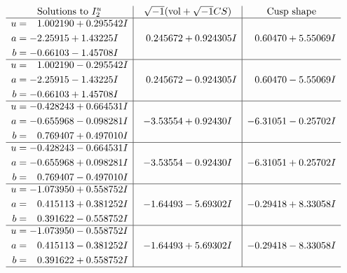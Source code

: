 \documentclass[1p]{elsarticle_modified}
\theoremstyle{definition}
\newcommand{\I}{\sqrt{-1}}
\begin{document}
$$\begin{array}{c|c|c}  
\text{Solutions to }I^u_{2}& \I (\text{vol} + \sqrt{-1}CS) & \text{Cusp shape}\\
 \hline 
\begin{aligned}
u &= \phantom{-}1.002190 + 0.295542 I \\
a &= -2.25915 + 1.43225 I \\
b &= -0.66103 - 1.45708 I\end{aligned}
 & \phantom{-}0.245672 + 0.924305 I & \phantom{-}0.60470 + 5.55069 I \\ \hline\begin{aligned}
u &= \phantom{-}1.002190 - 0.295542 I \\
a &= -2.25915 - 1.43225 I \\
b &= -0.66103 + 1.45708 I\end{aligned}
 & \phantom{-}0.245672 - 0.924305 I & \phantom{-}0.60470 - 5.55069 I \\ \hline\begin{aligned}
u &= -0.428243 + 0.664531 I \\
a &= -0.655968 - 0.098281 I \\
b &= \phantom{-}0.769407 + 0.497010 I\end{aligned}
 & -3.53554 + 0.92430 I & -6.31051 - 0.25702 I \\ \hline\begin{aligned}
u &= -0.428243 - 0.664531 I \\
a &= -0.655968 + 0.098281 I \\
b &= \phantom{-}0.769407 - 0.497010 I\end{aligned}
 & -3.53554 - 0.92430 I & -6.31051 + 0.25702 I \\ \hline\begin{aligned}
u &= -1.073950 + 0.558752 I \\
a &= \phantom{-}0.415113 + 0.381252 I \\
b &= \phantom{-}0.391622 - 0.558752 I\end{aligned}
 & -1.64493 - 5.69302 I & -0.29418 + 8.33058 I \\ \hline\begin{aligned}
u &= -1.073950 - 0.558752 I \\
a &= \phantom{-}0.415113 - 0.381252 I \\
b &= \phantom{-}0.391622 + 0.558752 I\end{aligned}
 & -1.64493 + 5.69302 I & -0.29418 - 8.33058 I\\
 \hline 
 \end{array}$$\newpage
\end{document}
